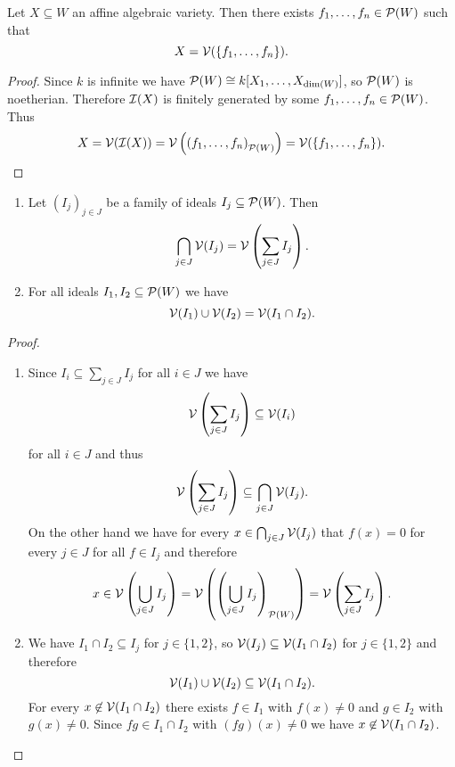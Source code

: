 \begin{cor}
 Let $X \subseteq W$ an affine algebraic variety. Then there exists $f_1, \dotsc, f_n \in \mathcal{P}(W)$ such that
 \[
  X = \mathcal{V}(\{f_1, \dotsc, f_n\}).
 \]
\end{cor}
\begin{proof}
 Since $k$ is infinite we have $\mathcal{P}(W) \cong k[X_1, \dotsc, X_{\dim(W)}]$, so $\mathcal{P}(W)$ is noetherian. Therefore $\mathcal{I}(X)$ is finitely generated by some $f_1, \dotsc, f_n \in \mathcal{P}(W)$. Thus
 \[
  X
  = \mathcal{V}(\mathcal{I}(X))
  = \mathcal{V}\left(\left(f_1, \dotsc, f_n\right)_{\mathcal{P}(W)}\right)
  = \mathcal{V}(\{f_1, \dotsc, f_n\}).
  \qedhere
 \]
\end{proof}


\begin{prop}
 \begin{enumerate}[label=\emph{\alph*)},leftmargin=*]
  \item
   Let $(I_j)_{j \in J}$ be a family of ideals $I_j \subseteq \mathcal{P}(W)$. Then
   \[
    \bigcap_{j \in J} \mathcal{V}(I_j) = \mathcal{V}\left( \sum_{j \in J} I_j \right).
   \]
  \item
   For all ideals $I_1, I_2 \subseteq \mathcal{P}(W)$ we have
   \[
    \mathcal{V}(I_1) \cup \mathcal{V}(I_2) = \mathcal{V}(I_1 \cap I_2).
   \]
 \end{enumerate}
\end{prop}
\begin{proof}
 \begin{enumerate}[label=\emph{\alph*)},leftmargin=*]
  \item
   Since $I_i \subseteq \sum_{j \in J} I_j$ for all $i \in J$ we have
   \[
    \mathcal{V}\left( \sum_{j \in J} I_j \right) \subseteq \mathcal{V}(I_i)
   \]
   for all $i \in J$ and thus
   \[
    \mathcal{V}\left( \sum_{j \in J} I_j \right) \subseteq \bigcap_{j \in J} \mathcal{V}(I_j).
   \]
   On the other hand we have for every $x \in \bigcap_{j \in J} \mathcal{V}(I_j)$ that $f(x) = 0$ for every $j \in J$ for all $f \in I_j$ and therefore
   \[
    x
    \in \mathcal{V}\left( \bigcup_{j \in J} I_j \right)
    = \mathcal{V}\left( \left( \bigcup_{j \in J} I_j \right)_{\mathcal{P}(W)} \right)
    = \mathcal{V}\left( \sum_{j \in J} I_j \right).
   \]
  \item
   We have $I_1 \cap I_2 \subseteq I_j$ for $j \in \{1,2\}$, so $\mathcal{V}(I_j) \subseteq \mathcal{V}(I_1 \cap I_2)$ for $j \in \{1,2\}$ and therefore
   \[
    \mathcal{V}(I_1) \cup \mathcal{V}(I_2) \subseteq \mathcal{V}(I_1 \cap I_2).
   \]
   For every $x \not\in \mathcal{V}(I_1 \cap I_2)$ there exists $f \in I_1$ with $f(x) \neq 0$ and $g \in I_2$ with $g(x) \neq 0$. Since $fg \in I_1 \cap I_2$ with $(fg)(x) \neq 0$ we have $x \not\in \mathcal{V}(I_1 \cap I_2)$.
  \qedhere
 \end{enumerate}
\end{proof}


